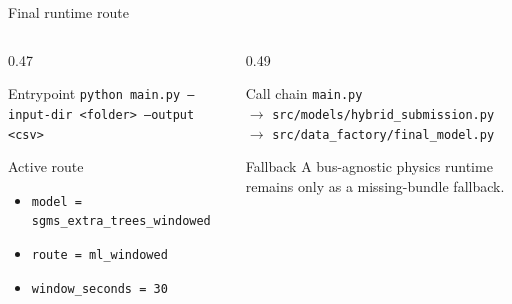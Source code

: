 \documentclass[aspectratio=169,10pt,t]{beamer}
\newcommand{\code}[1]{\texttt{\footnotesize #1}}
\begin{document}
\iffalse
\begin{frame}{Final runtime route}
\small
\begin{columns}[T,totalwidth=\textwidth]
\begin{column}{0.47\textwidth}
\begin{block}{Entrypoint}
\code{python main.py --input-dir <folder> --output <csv>}
\end{block}
\begin{block}{Active route}
\begin{itemize}
  \item \code{model = sgms\_extra\_trees\_windowed}
  \item \code{route = ml\_windowed}
  \item \code{window\_seconds = 30}
\end{itemize}
\end{block}
\end{column}
\begin{column}{0.49\textwidth}
\begin{exampleblock}{Call chain}
\code{main.py}\\
$\rightarrow$ \code{src/models/hybrid\_submission.py}\\
$\rightarrow$ \code{src/data\_factory/final\_model.py}
\end{exampleblock}
\begin{alertblock}{Fallback}
A bus-agnostic physics runtime remains only as a missing-bundle fallback.
\end{alertblock}
\end{column}
\end{columns}
\end{frame}
\end{document}
